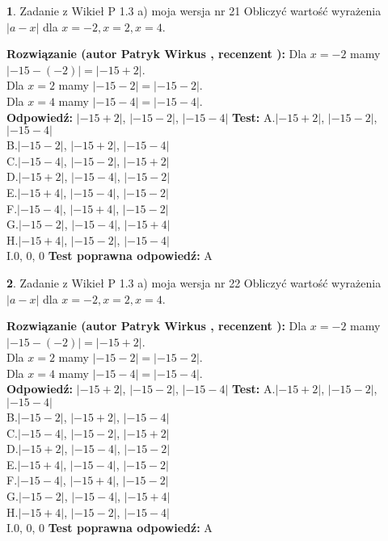 \documentclass[12pt, a4paper]{article}
\theoremstyle{definition} %
\newtheorem{zad}{}
\newcommand{\zadStart}[1]{\begin{zad}#1\newline}
\newcommand{\zadStop}{\end{zad}}
\newcommand{\rozwStart}[2]{\noindent \textbf{Rozwiązanie (autor #1 , recenzent #2): }\newline}
\newcommand{\rozwStop}{\newline}
\newcommand{\odpStart}{\noindent \textbf{Odpowiedź:}\newline}
\newcommand{\odpStop}{\newline}
\newcommand{\testStart}{\noindent \textbf{Test:}\newline}
\newcommand{\testStop}{\newline}
\newcommand{\kluczStart}{\noindent \textbf{Test poprawna odpowiedź:}\newline}
\newcommand{\kluczStop}{\newline}
\begin{document}
\zadStart{Zadanie z Wikieł P 1.3 a) moja wersja nr 21}
Obliczyć wartość wyrażenia $|a - x|$ dla $x=-2,x=2,x=4$.
\zadStop
\rozwStart{Patryk Wirkus}{}
Dla $x = -2$ mamy $|-15 - (-2)| = |-15 + 2|$.\\
Dla $x = 2$ mamy $|-15 - 2| = |-15 - 2|$.\\
Dla $x = 4$ mamy $|-15 - 4| = |-15 - 4|$.\\
\rozwStop
\odpStart
$|-15 + 2|$, $|-15 - 2|$, $|-15 - 4|$
\odpStop
\testStart
A.$|-15 + 2|$, $|-15 - 2|$, $|-15 - 4|$\\
B.$|-15 - 2|$, $|-15 + 2|$, $|-15 - 4|$\\
C.$|-15 - 4|$, $|-15 - 2|$, $|-15 + 2|$\\
D.$|-15 + 2|$, $|-15 - 4|$, $|-15 - 2|$\\
E.$|-15 + 4|$, $|-15 - 4|$, $|-15 - 2|$\\
F.$|-15 - 4|$, $|-15 + 4|$, $|-15 - 2|$\\
G.$|-15 - 2|$, $|-15 - 4|$, $|-15 + 4|$\\
H.$|-15 + 4|$, $|-15 - 2|$, $|-15 - 4|$\\
I.$0$, $0$, $0$
\testStop
\kluczStart
A
\kluczStop



\zadStart{Zadanie z Wikieł P 1.3 a) moja wersja nr 22}
Obliczyć wartość wyrażenia $|a - x|$ dla $x=-2,x=2,x=4$.
\zadStop
\rozwStart{Patryk Wirkus}{}
Dla $x = -2$ mamy $|-15 - (-2)| = |-15 + 2|$.\\
Dla $x = 2$ mamy $|-15 - 2| = |-15 - 2|$.\\
Dla $x = 4$ mamy $|-15 - 4| = |-15 - 4|$.\\
\rozwStop
\odpStart
$|-15 + 2|$, $|-15 - 2|$, $|-15 - 4|$
\odpStop
\testStart
A.$|-15 + 2|$, $|-15 - 2|$, $|-15 - 4|$\\
B.$|-15 - 2|$, $|-15 + 2|$, $|-15 - 4|$\\
C.$|-15 - 4|$, $|-15 - 2|$, $|-15 + 2|$\\
D.$|-15 + 2|$, $|-15 - 4|$, $|-15 - 2|$\\
E.$|-15 + 4|$, $|-15 - 4|$, $|-15 - 2|$\\
F.$|-15 - 4|$, $|-15 + 4|$, $|-15 - 2|$\\
G.$|-15 - 2|$, $|-15 - 4|$, $|-15 + 4|$\\
H.$|-15 + 4|$, $|-15 - 2|$, $|-15 - 4|$\\
I.$0$, $0$, $0$
\testStop
\kluczStart
A
\kluczStop
\end{document}
